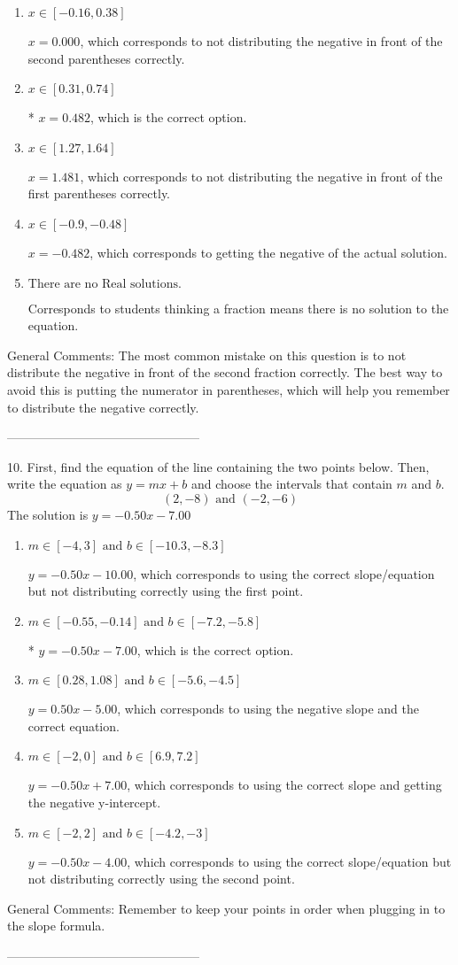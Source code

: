 \documentclass{article}[14pt]
\begin{document}
\begin{enumerate}[label=\Alph*.] 
\item $ x \in [-0.16, 0.38] $ 

  $x = 0.000$, which corresponds to not distributing the negative in front of the second parentheses correctly. 
\item $ x \in [0.31, 0.74] $ 

 * $x = 0.482$, which is the correct option. 
\item $ x \in [1.27, 1.64] $ 

  $x = 1.481$, which corresponds to not distributing the negative in front of the first parentheses correctly. 
\item $ x \in [-0.9, -0.48] $ 

  $x = -0.482$, which corresponds to getting the negative of the actual solution. 
\item $ \text{There are no Real solutions. } $ 

 Corresponds to students thinking a fraction means there is no solution to the equation. 
\end{enumerate} 
 
General Comments: The most common mistake on this question is to not distribute the negative in front of the second fraction correctly. The best way to avoid this is putting the numerator in parentheses, which will help you remember to distribute the negative correctly.

-----------------------------------------------

10. First, find the equation of the line containing the two points below. Then, write the equation as $ y=mx+b $ and choose the intervals that contain $m$ and $b$.
$$ (2, -8) \text{ and } (-2, -6) $$ 
The solution is $ y = -0.50x - 7.00 $ 

\begin{enumerate}[label=\Alph*.] 
\item $ m \in [-4, 3] \text{ and } b \in [-10.3, -8.3] $ 

  $y = -0.50x - 10.00$, which corresponds to using the correct slope/equation but not distributing correctly using the first point. 
\item $ m \in [-0.55, -0.14] \text{ and } b \in [-7.2, -5.8] $ 

 * $y = -0.50x - 7.00$, which is the correct option. 
\item $ m \in [0.28, 1.08] \text{ and } b \in [-5.6, -4.5] $ 

  $y = 0.50x - 5.00$, which corresponds to using the negative slope and the correct equation. 
\item $ m \in [-2, 0] \text{ and } b \in [6.9, 7.2] $ 

  $y = -0.50x + 7.00$, which corresponds to using the correct slope and getting the negative y-intercept. 
\item $ m \in [-2, 2] \text{ and } b \in [-4.2, -3] $ 

  $y = -0.50x - 4.00$, which corresponds to using the correct slope/equation but not distributing correctly using the second point. 
\end{enumerate} 
 
General Comments: Remember to keep your points in order when plugging in to the slope formula.

-----------------------------------------------
\end{document}
